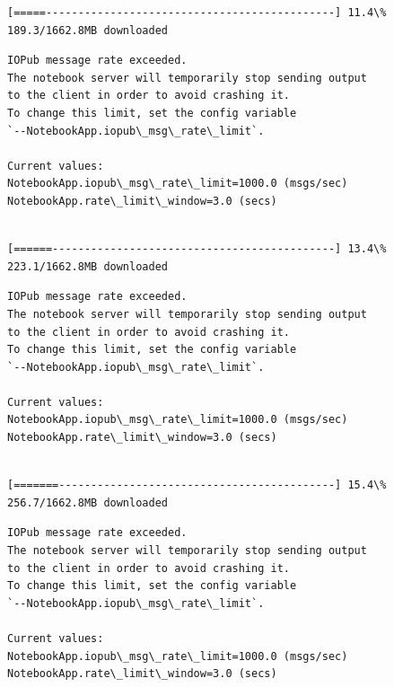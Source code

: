 \documentclass[11pt]{article}
\begin{document}
    \begin{Verbatim}[commandchars=\\\{\}]
[=====---------------------------------------------] 11.4\% 189.3/1662.8MB downloaded
    \end{Verbatim}

    \begin{Verbatim}[commandchars=\\\{\}]
IOPub message rate exceeded.
The notebook server will temporarily stop sending output
to the client in order to avoid crashing it.
To change this limit, set the config variable
`--NotebookApp.iopub\_msg\_rate\_limit`.

Current values:
NotebookApp.iopub\_msg\_rate\_limit=1000.0 (msgs/sec)
NotebookApp.rate\_limit\_window=3.0 (secs)


    \end{Verbatim}

    \begin{Verbatim}[commandchars=\\\{\}]
[======--------------------------------------------] 13.4\% 223.1/1662.8MB downloaded
    \end{Verbatim}

    \begin{Verbatim}[commandchars=\\\{\}]
IOPub message rate exceeded.
The notebook server will temporarily stop sending output
to the client in order to avoid crashing it.
To change this limit, set the config variable
`--NotebookApp.iopub\_msg\_rate\_limit`.

Current values:
NotebookApp.iopub\_msg\_rate\_limit=1000.0 (msgs/sec)
NotebookApp.rate\_limit\_window=3.0 (secs)


    \end{Verbatim}

    \begin{Verbatim}[commandchars=\\\{\}]
[=======-------------------------------------------] 15.4\% 256.7/1662.8MB downloaded
    \end{Verbatim}

    \begin{Verbatim}[commandchars=\\\{\}]
IOPub message rate exceeded.
The notebook server will temporarily stop sending output
to the client in order to avoid crashing it.
To change this limit, set the config variable
`--NotebookApp.iopub\_msg\_rate\_limit`.

Current values:
NotebookApp.iopub\_msg\_rate\_limit=1000.0 (msgs/sec)
NotebookApp.rate\_limit\_window=3.0 (secs)


    \end{Verbatim}
\end{document}
